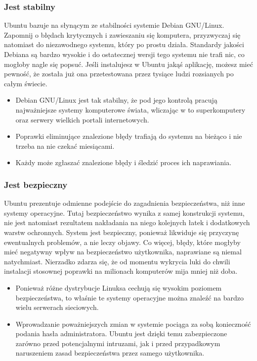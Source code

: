 \subsubsection{Jest stabilny}
Ubuntu bazuje na słynącym ze stabilności systemie Debian GNU/Linux. Zapomnij o błędach krytycznych i zawieszaniu się komputera, przyzwyczaj się natomiast do niezawodnego systemu, który po prostu działa. Standardy jakości Debiana są bardzo wysokie i do ostatecznej wersji tego systemu nie trafi nic, co mogłoby nagle się popsuć. Jeśli instalujesz w Ubuntu jakąś aplikację, możesz mieć pewność, że została już ona przetestowana przez tysiące ludzi rozsianych po całym świecie.
\begin{itemize}
\item Debian GNU/Linux jest tak stabilny, że pod jego kontrolą pracują najważniejsze systemy komputerowe świata, wliczając w to superkomputery oraz serwery wielkich portali internetowych.
\item Poprawki eliminujące znalezione błędy trafiają do systemu na bieżąco i nie trzeba na nie czekać miesiącami.
\item Każdy może zgłaszać znalezione błędy i śledzić proces ich naprawiania.
\end{itemize}
\subsubsection{Jest bezpieczny}
Ubuntu prezentuje odmienne podejście do zagadnienia bezpieczeństwa, niż inne systemy operacyjne. Tutaj bezpieczeństwo wynika z samej konstrukcji systemu, nie jest natomiast rezultatem nakładania na niego kolejnych łatek i dodatkowych warstw ochronnych. System jest bezpieczny, ponieważ likwiduje się przyczynę ewentualnych problemów, a nie leczy objawy. Co więcej, błędy, które mogłyby mieć negatywny wpływ na bezpieczeństwo użytkownika, naprawiane są niemal natychmiast. Nierzadko zdarza się, że od momentu wykrycia luki do chwili instalacji stosownej poprawki na milionach komputerów mija mniej niż doba.
\begin{itemize}
\item Ponieważ różne dystrybucje Linuksa cechują się wysokim poziomem bezpieczeństwa, to właśnie te systemy operacyjne można znaleźć na bardzo wielu serwerach sieciowych.
\item Wprowadzanie poważniejszych zmian w systemie pociąga za sobą konieczność podania hasła administratora. Ubuntu jest dzięki temu zabezpieczone zarówno przed potencjalnymi intruzami, jak i przed przypadkowym naruszeniem zasad bezpieczeństwa przez samego użytkownika.
\end{itemize}
